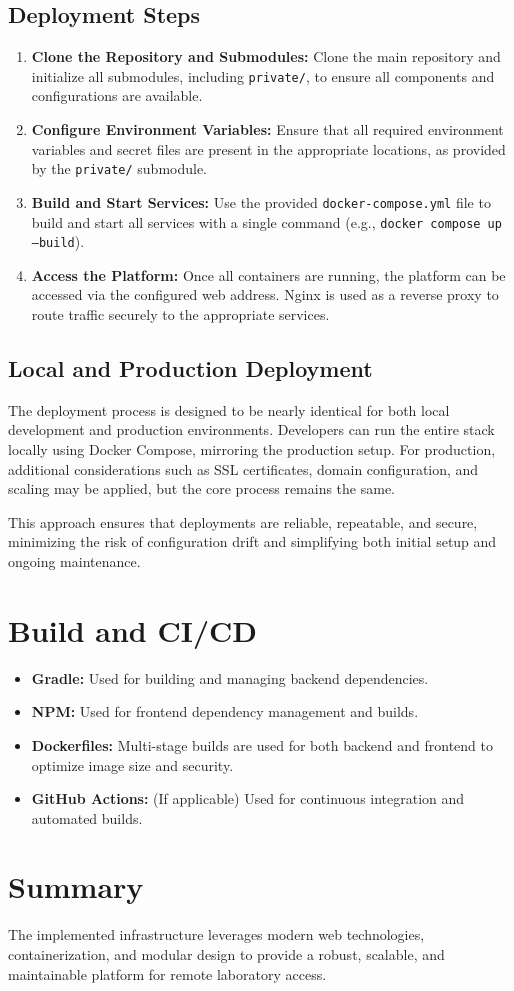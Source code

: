 \subsection{Deployment Steps} \label{subsec:deployment_steps}
\begin{enumerate}
    \item \textbf{Clone the Repository and Submodules:} Clone the main repository and initialize all submodules, including \texttt{private/}, to ensure all components and configurations are available.
    \item \textbf{Configure Environment Variables:} Ensure that all required environment variables and secret files are present in the appropriate locations, as provided by the \texttt{private/} submodule.
    \item \textbf{Build and Start Services:} Use the provided \texttt{docker-compose.yml} file to build and start all services with a single command (e.g., \texttt{docker compose up --build}).
    \item \textbf{Access the Platform:} Once all containers are running, the platform can be accessed via the configured web address. Nginx is used as a reverse proxy to route traffic securely to the appropriate services.
\end{enumerate}

\subsection{Local and Production Deployment} \label{subsec:local_prod_deployment}
The deployment process is designed to be nearly identical for both local development and production environments. Developers can run the entire stack locally using Docker Compose, mirroring the production setup. For production, additional considerations such as SSL certificates, domain configuration, and scaling may be applied, but the core process remains the same.

This approach ensures that deployments are reliable, repeatable, and secure, minimizing the risk of configuration drift and simplifying both initial setup and ongoing maintenance.

\section{Build and CI/CD} \label{sec:build_cicd}

\begin{itemize}
    \item \textbf{Gradle:} Used for building and managing backend dependencies.
    \item \textbf{NPM:} Used for frontend dependency management and builds.
    \item \textbf{Dockerfiles:} Multi-stage builds are used for both backend and frontend to optimize image size and security.
    \item \textbf{GitHub Actions:} (If applicable) Used for continuous integration and automated builds.
\end{itemize}

\section{Summary}

The implemented infrastructure leverages modern web technologies, containerization, and modular design to provide a robust, scalable, and maintainable platform for remote laboratory access.